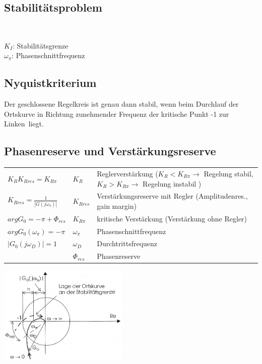 


	\subsection{Stabilitätsproblem }
		\begin{minipage}{5cm}
		 \\
		\end{minipage}
		\begin{minipage}{13cm}
        $K_I$: Stabilitätsgrenze \\
        $\omega_\pi$: Phasenschnittfrequenz
        \end{minipage}


	\subsection{Nyquistkriterium }
		Der geschlossene Regelkreis ist genau dann stabil, wenn beim Durchlauf der
		Ortskurve in Richtung zunehmender Frequenz der kritische Punkt -1 \glqq zur
		Linken\grqq\ liegt.
		
	\subsection{Phasenreserve und Verstärkungsreserve }
		\begin{tabular}{l|ll}
			$K_RK_{Rres}=K_{R\pi}$ & $K_R$ & Reglerverstärkung ($K_R < K_{R\pi} \rightarrow$ Regelung stabil, $K_R > K_{R\pi} \rightarrow$ Regelung
			instabil	) \\
			$K_{Rres}=\frac{1}{\left| G(j\omega_{\pi})\right|}$ & $K_{Rres}$ & 	Verstärkungsreserve mit Regler (Amplitudenres., gain margin) \\
			$argG_0=-\pi+\Phi_{res}$ & $K_{R\pi}$ & kritische Verstärkung (Verstärkung ohne	Regler) \\
			$argG_0(\omega_\pi)=-\pi$ & $\omega_\pi$ & Phasenschnittfrequenz\\
			$|G_0(j\omega_D)|=1$ & $\omega_D$ & Durchtrittsfrequenz \\
			& $\Phi_{res}$ & Phasenreserve
		\end{tabular}
		
        \includegraphics[width=6.2cm]{./images/phasenreserve.png}
			
